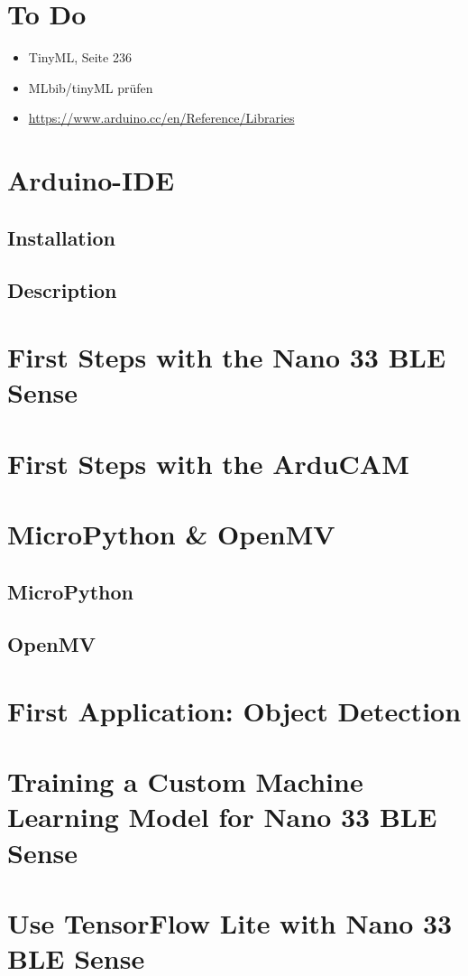%
%
%


\chapter{To Do}


\begin{itemize}
    \item TinyML, Seite 236
    \item MLbib/tinyML prüfen
    \item \url{https://www.arduino.cc/en/Reference/Libraries}
\end{itemize}

\chapter{Arduino-IDE}

\section{Installation}

\section{Description}

\chapter{First Steps with the Nano 33 BLE Sense}

\chapter{First Steps with the ArduCAM}



\chapter{MicroPython \& OpenMV}

\section{MicroPython}

\section{OpenMV}

\chapter{First Application: Object Detection}

\chapter{Training a Custom Machine Learning Model for Nano 33 BLE Sense}

\chapter{Use TensorFlow Lite with Nano 33 BLE Sense}
